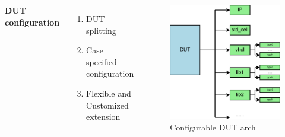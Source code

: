 \documentclass{beamer}
\begin{document}
\begin{frame}
  \begin{columns}[c] %

    \textbf{DUT configuration}
    \begin{enumerate}
    \item DUT splitting
    \item Case specified configuration
    \item Flexible and Customized extension
    \end{enumerate}

    \begin{figure}
      \centering
      \includegraphics[width=0.9\linewidth]{dut_split}
      \caption{Configurable DUT arch}
    \end{figure}

  \end{columns}
\end{frame}
\end{document}
